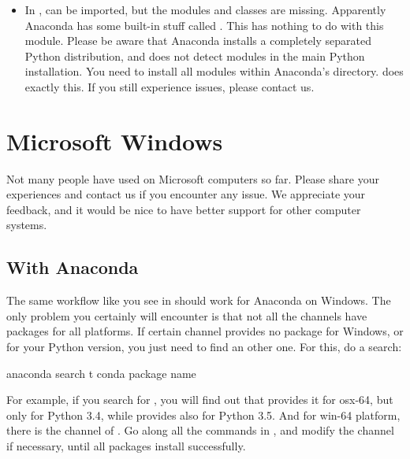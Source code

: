 \documentclass[letterpaper,10pt,english]{sphinxmanual}
\begin{document}
\begin{itemize}
\item {} 
In ,  can be imported, but the modules and classes are
missing. Apparently Anaconda has some built-in stuff called . This
has nothing to do with this module. Please be aware that Anaconda installs a
completely separated Python distribution, and does not detect modules in the
main Python installation. You need to install all modules within Anaconda’s
directory.  does exactly this. If you still
experience issues, please contact us.

\end{itemize}


\section{Microsoft Windows}
\label{\detokenize{installation:microsoft-windows}}
Not many people have used  on Microsoft computers so far. Please share
your experiences and contact us if you encounter any issue. We appreciate
your feedback, and it would be nice to have better support for other computer
systems.


\subsection{With Anaconda}
\label{\detokenize{installation:with-anaconda}}
The same workflow like you see in  should work for
Anaconda on Windows. The only problem you certainly will encounter is that not
all the channels have packages for all platforms. If certain channel provides
no package for Windows, or for your Python version, you just need to find an
other one. For this, do a search:

\begin{sphinxVerbatim}[commandchars=\\\{\}]
anaconda search \PYGZhy{}t conda \PYGZlt{}package name\PYGZgt{}
\end{sphinxVerbatim}

For example, if you search for , you will find out that 
provides it for osx-64, but only for Python 3.4, while  provides
also for Python 3.5. And for win-64 platform, there is the channel of
. Go along all the commands in , and
modify the channel if necessary, until all packages install successfully.
\end{document}
